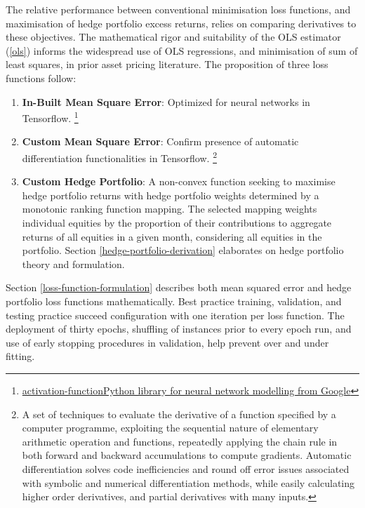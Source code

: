 \documentclass[12pt]{article}
\begin{document}
The relative performance between conventional minimisation loss functions, and maximisation of hedge portfolio excess returns, relies on comparing derivatives to these objectives.
The mathematical rigor and suitability of the OLS estimator (\ref{ols}) informs the widespread use of OLS regressions, and minimisation of sum of least squares, in prior asset pricing literature.
The proposition of three loss functions follow:
\singlespacing
\begin{enumerate}
	\item \textbf{In-Built Mean Square Error}: Optimized for neural networks in Tensorflow. \footnote{\href{https://www.tensorflow.org/}{activation-functionPython library for neural network modelling from Google}}
	\item \textbf{Custom Mean Square Error}: Confirm presence of automatic differentiation functionalities in Tensorflow.
	\footnote{A set of techniques to evaluate the derivative of a function specified by a computer programme,
	exploiting the sequential nature of elementary arithmetic operation and functions, repeatedly applying the chain rule in both forward and backward accumulations to compute gradients.
	Automatic differentiation solves code inefficiencies and round off error issues associated with symbolic and numerical differentiation methods, while easily calculating higher order derivatives, and partial derivatives with many inputs.}
	\item \textbf{Custom Hedge Portfolio}: A non-convex function seeking to maximise hedge portfolio returns with hedge portfolio weights determined by a monotonic ranking function mapping.
	The selected mapping weights individual equities by the proportion of their contributions to aggregate returns of all equities in a given month, considering all equities in the portfolio.
	Section \ref{hedge-portfolio-derivation} elaborates on hedge portfolio theory and formulation.
\end{enumerate}
Section \ref{loss-function-formulation} describes both mean squared error and hedge portfolio loss functions mathematically.
Best practice training, validation, and testing practice succeed configuration with one iteration per loss function.
The deployment of thirty epochs, shuffling of instances prior to every epoch run, and use of early stopping procedures in validation, help prevent over and under fitting.
\end{document}
